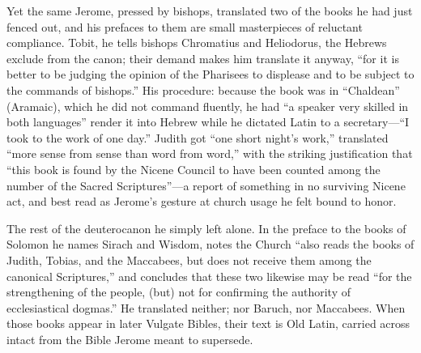 Yet the same Jerome, pressed by bishops, translated two of the books he
had just fenced out, and his prefaces to them are small masterpieces of
reluctant compliance. Tobit, he tells bishops Chromatius and Heliodorus,
the Hebrews exclude from the canon; their demand makes him translate it
anyway, ``for it is better to be judging the opinion of the Pharisees to
displease and to be subject to the commands of bishops.'' His procedure:
because the book was in ``Chaldean'' (Aramaic), which he did not command
fluently, he had ``a speaker very skilled in both languages'' render it
into Hebrew while he dictated Latin to a secretary---``I took to the work
of one day.'' Judith got ``one
short night's work,'' translated ``more sense from sense than word from
word,'' with the striking justification that ``this book is found by the
Nicene Council to have been counted among the number of the Sacred
Scriptures''---a report of something in no surviving Nicene act, and
best read as Jerome's gesture at church usage he felt bound to
honor.

The rest of the deuterocanon he simply left alone. In the preface to the
books of Solomon he names Sirach and Wisdom, notes the Church ``also
reads the books of Judith, Tobias, and the Maccabees, but does not
receive them among the canonical Scriptures,'' and concludes that these
two likewise may be read ``for the strengthening of the people, (but) not
for confirming the authority of ecclesiastical dogmas.'' He translated
neither; nor Baruch, nor Maccabees. When those books appear in later
Vulgate Bibles, their text is Old Latin, carried across intact from the
Bible Jerome meant to supersede.

